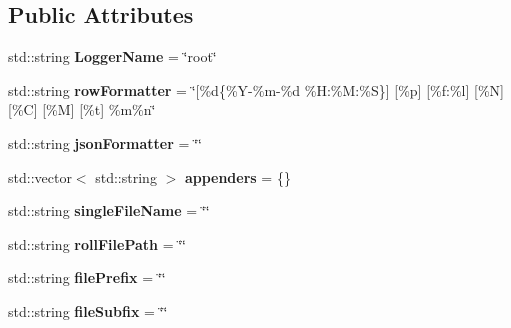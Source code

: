 \subsection*{Public Attributes}
\begin{DoxyCompactItemize}
\item 
\mbox{\label{structLogConfigStruct_ae3a0a134db3abb9ae860327969649804}} 
std\+::string {\bfseries Logger\+Name} = \char`\"{}root\char`\"{}
\item 
\mbox{\label{structLogConfigStruct_ac26869fa929bbba455ea39a2bd1a74f2}} 
std\+::string {\bfseries row\+Formatter} = \char`\"{}\mbox{[}\%d\{\%Y-\/\%m-\/\%d \%H\+:\%M\+:\%S\}\mbox{]} \mbox{[}\%p\mbox{]} \mbox{[}\%f\+:\%l\mbox{]} \mbox{[}\%N\mbox{]} \mbox{[}\%C\mbox{]} \mbox{[}\%M\mbox{]} \mbox{[}\%t\mbox{]} \%m\%n\char`\"{}
\item 
\mbox{\label{structLogConfigStruct_a0ae58a956602dbacce37096f66a706ae}} 
std\+::string {\bfseries json\+Formatter} = \char`\"{}\char`\"{}
\item 
\mbox{\label{structLogConfigStruct_a80d6e9cbb3d519f82f9e104331f93ef7}} 
std\+::vector$<$ std\+::string $>$ {\bfseries appenders} = \{\}
\item 
\mbox{\label{structLogConfigStruct_a8762a16c89786b1c0156e9c39363c9d4}} 
std\+::string {\bfseries single\+File\+Name} = \char`\"{}\char`\"{}
\item 
\mbox{\label{structLogConfigStruct_a1099d3b33d2c5a078dedb54e64e9f5db}} 
std\+::string {\bfseries roll\+File\+Path} = \char`\"{}\char`\"{}
\item 
\mbox{\label{structLogConfigStruct_a601ebcda77cb962c9dd4872f38b7224c}} 
std\+::string {\bfseries file\+Prefix} = \char`\"{}\char`\"{}
\item 
\mbox{\label{structLogConfigStruct_ad12e623bc254c609d3d9d864f70be28a}} 
std\+::string {\bfseries file\+Subfix} = \char`\"{}\char`\"{}
\item 
\mbox{\label{structLogConfigStruct_a48a192653763e7a780dc1318902c170f}} 

\end{DoxyCompactItemize}
